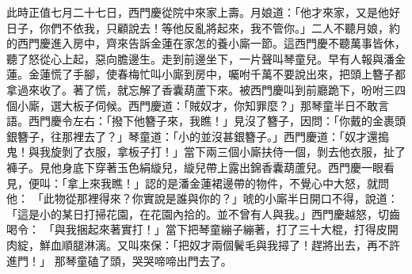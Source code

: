 此時正值七月二十七日，西門慶從院中來家上壽。月娘道：「他才來家，又是他好日子，你們不依我，只顧說去！等他反亂將起來，我不管你。」二人不聽月娘，約的西門慶進入房中，齊來告訴金蓮在家怎的養小廝一節。這西門慶不聽萬事皆休，聽了怒從心上起，惡向膽邊生。走到前邊坐下，一片聲叫琴童兒。早有人報與潘金蓮。金蓮慌了手腳，使春梅忙叫小廝到房中，囑咐千萬不要說出來，把頭上簪子都拿過來收了。著了慌，就忘解了香囊葫蘆下來。被西門慶叫到前廳跪下，吩咐三四個小廝，選大板子伺候。西門慶道：「賊奴才，你知罪麼？」那琴童半日不敢言語。西門慶令左右：「撥下他簪子來，我瞧！」見沒了簪子，因問：「你戴的金裹頭銀簪子，往那裡去了？」琴童道：「小的並沒甚銀簪子。」西門慶道：「奴才還搗鬼！與我旋剝了衣服，拿板子打！」當下兩三個小廝扶侍一個，剝去他衣服，扯了褲子。見他身底下穿著玉色絹縼兒，縼兒帶上露出錦香囊葫蘆兒。西門慶一眼看見，便叫：「拿上來我瞧！」認的是潘金蓮裙邊帶的物件，不覺心中大怒，就問他： 「此物從那裡得來？你實說是誰與你的？」唬的小廝半日開口不得，說道：「這是小的某日打掃花園，在花園內拾的。並不曾有人與我。」西門慶越怒，切齒喝令： 「與我捆起來著實打！」當下把琴童繃子繃著，打了三十大棍，打得皮開肉綻，鮮血順腿淋漓。又叫來保：「把奴才兩個鬢毛與我撏了！趕將出去，再不許進門！」 那琴童磕了頭，哭哭啼啼出門去了。

